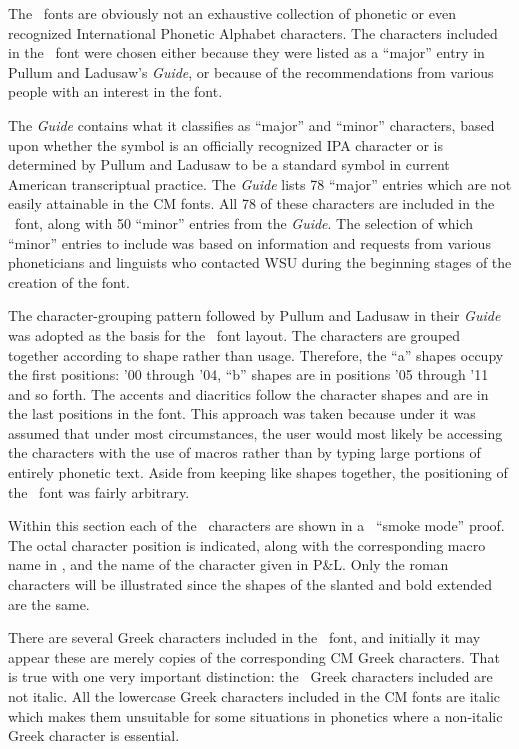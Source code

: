 The \wsu\  fonts are obviously not an exhaustive collection of phonetic or
even recognized International Phonetic Alphabet characters. The characters
included in the \wsu\  font were chosen either because they were listed
as a ``major'' entry in Pullum and Ladusaw's {\it Guide\/},
or because of the recommendations from
various people with an interest in the font.
 
The {\it Guide} contains what it classifies as ``major'' and ``minor''
characters, based upon whether the symbol is an officially recognized IPA
character or is determined by Pullum and Ladusaw
to be a standard symbol in current American
transcriptual practice. The {\it Guide}
lists 78 ``major'' entries which are not easily
attainable in the CM fonts. All 78 of these characters are included in the
\wsu\  font, along with 50 ``minor'' entries from the {\it Guide}.
The selection of which
``minor'' entries to include was based on information and requests from
various phoneticians and linguists who contacted WSU during the beginning
stages of the creation of the font.
 
 
The character-grouping pattern followed by Pullum and Ladusaw in their
{\it Guide} was adopted as the basis
for the \wsu\ font layout. The characters
are grouped together according to shape rather than usage. Therefore,
the ``a'' shapes occupy
the first positions: '00 through '04, ``b'' shapes are in positions '05
through '11 and so forth. The accents and diacritics follow the character
shapes and are in the last positions in the font. This approach was taken
because under it was assumed that under most circumstances,
the user would most likely be accessing the characters with the use of macros
rather than by typing large portions of entirely phonetic text.
Aside from keeping like shapes together, the positioning of the
\wsu\  font was fairly arbitrary.
 
 
Within this section each of the \wsu\  characters are shown in a \meta\
``smoke mode'' proof. The octal character position is indicated, along with the
corresponding macro name in \ipam, and the
name of the character given in P\&L.
Only the roman characters will be illustrated since the shapes of the slanted
and bold extended are the same.
 
There are several Greek characters included in the \wsu\ font, and initially
it may appear these are merely copies of the corresponding CM Greek characters.
That is true with one very important distinction: the \wsu\ Greek characters
included are not italic. All the lowercase Greek characters included in
the CM fonts are italic which makes them unsuitable for some situations in
phonetics where a non-italic Greek character is essential.
\newpage
\raggedbottom
\vbox{ }
 

